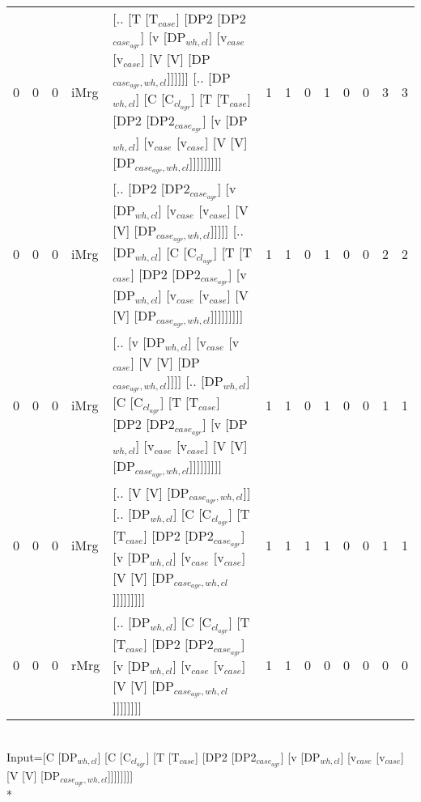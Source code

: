 \begin{tabularx}{\linewidth}{rrrlXrrrrrrrr}
   0 &       0 &   0 & iMrg & [.. [T [T$_{case}$] [DP2 [DP2$_{case_{agr}}$] [v [DP$_{wh,cl}$] [v$_{case}$ [v$_{case}$] [V [V] [DP$_{case_{agr},wh,cl}$]]]]]] [.. [DP$_{wh,cl}$] [C [C$_{cl_{agr}}$] [T [T$_{case}$] [DP2 [DP2$_{case_{agr}}$] [v [DP$_{wh,cl}$] [v$_{case}$ [v$_{case}$] [V [V] [DP$_{case_{agr},wh,cl}$]]]]]]]]]                &             1 &             1 &                  0 &            1 &                0 &              0 &        3 &        3 \\
   0 &       0 &   0 & iMrg & [.. [DP2 [DP2$_{case_{agr}}$] [v [DP$_{wh,cl}$] [v$_{case}$ [v$_{case}$] [V [V] [DP$_{case_{agr},wh,cl}$]]]]] [.. [DP$_{wh,cl}$] [C [C$_{cl_{agr}}$] [T [T$_{case}$] [DP2 [DP2$_{case_{agr}}$] [v [DP$_{wh,cl}$] [v$_{case}$ [v$_{case}$] [V [V] [DP$_{case_{agr},wh,cl}$]]]]]]]]]                             &             1 &             1 &                  0 &            1 &                0 &              0 &        2 &        2 \\
   0 &       0 &   0 & iMrg & [.. [v [DP$_{wh,cl}$] [v$_{case}$ [v$_{case}$] [V [V] [DP$_{case_{agr},wh,cl}$]]]] [.. [DP$_{wh,cl}$] [C [C$_{cl_{agr}}$] [T [T$_{case}$] [DP2 [DP2$_{case_{agr}}$] [v [DP$_{wh,cl}$] [v$_{case}$ [v$_{case}$] [V [V] [DP$_{case_{agr},wh,cl}$]]]]]]]]]                                                  &             1 &             1 &                  0 &            1 &                0 &              0 &        1 &        1 \\
   0 &       0 &   0 & iMrg & [.. [V [V] [DP$_{case_{agr},wh,cl}$]] [.. [DP$_{wh,cl}$] [C [C$_{cl_{agr}}$] [T [T$_{case}$] [DP2 [DP2$_{case_{agr}}$] [v [DP$_{wh,cl}$] [v$_{case}$ [v$_{case}$] [V [V] [DP$_{case_{agr},wh,cl}$]]]]]]]]]                                                                                   &             1 &             1 &                  1 &            1 &                0 &              0 &        1 &        1 \\
   0 &       0 &   0 & rMrg & [.. [DP$_{wh,cl}$] [C [C$_{cl_{agr}}$] [T [T$_{case}$] [DP2 [DP2$_{case_{agr}}$] [v [DP$_{wh,cl}$] [v$_{case}$ [v$_{case}$] [V [V] [DP$_{case_{agr},wh,cl}$]]]]]]]]                                                                                                                    &             1 &             1 &                  0 &            0 &                0 &              0 &        0 &        0 \\
\hline
\end{tabularx}\endgroup\\
\begingroup\scriptsize Input=[C [DP$_{wh,cl}$] [C [C$_{cl_{agr}}$] [T [T$_{case}$] [DP2 [DP2$_{case_{agr}}$] [v [DP$_{wh,cl}$] [v$_{case}$ [v$_{case}$] [V [V] [DP$_{case_{agr},wh,cl}$]]]]]]]]\\*
